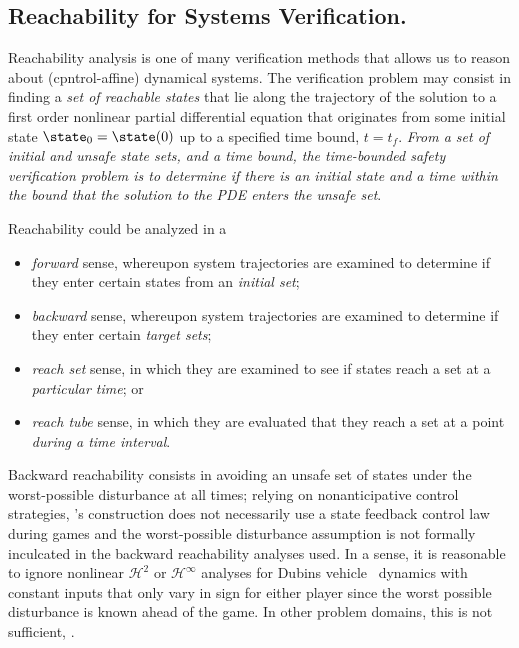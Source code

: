 \subsection{Reachability for Systems Verification.}
\noindent Reachability analysis is one of many verification methods that allows us to reason about (cpntrol-affine) dynamical systems. %
The verification problem may consist in finding a \textit{set of reachable states} that lie along the trajectory of the solution to a first order nonlinear partial differential equation that originates from some initial state $\state_0 = \state(0)$ up to a specified time bound, $t=t_f$. \textit{From a set of initial and unsafe state sets, and a time bound, the time-bounded safety verification problem is to determine if there is an initial state and a time within the bound that the solution to the PDE enters the unsafe set}.

Reachability could be analyzed in a 
%
\begin{itemize}%
	\item \textit{forward} sense, whereupon system trajectories are examined to determine if they enter certain states from an \textit{initial set};
	\item \textit{backward} sense, whereupon system trajectories are examined to determine if they enter certain \textit{target sets};
	\item \textit{reach set} sense, in which they are examined to see if states reach a set at a \textit{particular time}; or
	\item \textit{reach tube} sense, in which they are evaluated that they reach a set at a point \textit{during a time interval}.	
\end{itemize} 

Backward reachability consists in avoiding an unsafe set of states under the worst-possible disturbance at all times; relying on nonanticipative control strategies, \cite{Mitchell2005}'s construction does not necessarily use a state feedback control law during games and the worst-possible disturbance assumption is not formally inculcated in the backward reachability analyses used. In a sense, it is reasonable to ignore nonlinear $\mathcal{H}^2$ or $\mathcal{H}^\infty$ analyses for Dubins vehicle~\cite{Dubins1957} dynamics with constant inputs that only vary in sign for either player \cite{Merz1972} since the worst possible disturbance is known ahead of the game. In other problem domains, this is not sufficient, . 

